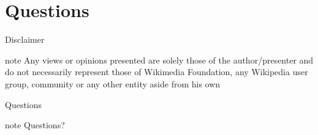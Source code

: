 \documentclass{beamer}
\begin{document}
\section{Questions}
\begin{frame}{Disclaimer}
	\begin{beamercolorbox}[center,shadow=true,rounded=true,]{note}
	Any views or opinions presented are solely those of the author/presenter and do not necessarily
	represent those of Wikimedia Foundation, any Wikipedia user group, community or any other entity
	aside from his own
	\end{beamercolorbox}
\end{frame}

\begin{frame}{Questions}
	\begin{beamercolorbox}[center,shadow=true,rounded=true,]{note}
		        Questions?
	\end{beamercolorbox}
\end{frame}
\end{document}
